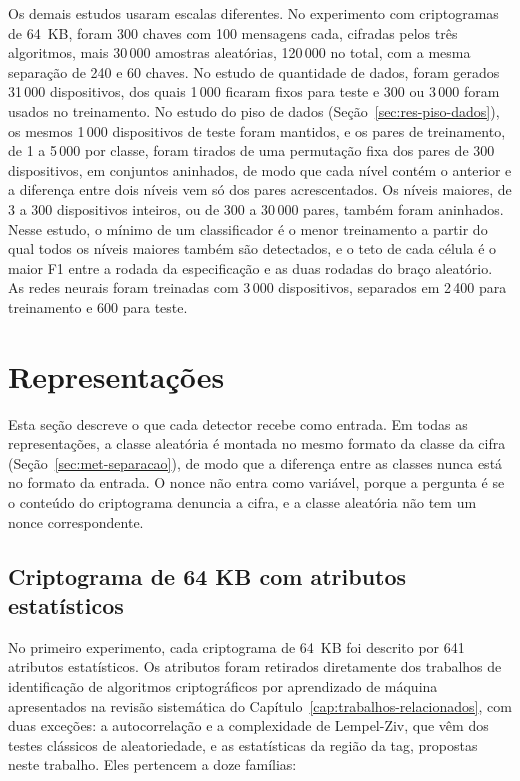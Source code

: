 Os demais estudos usaram escalas diferentes. No experimento com criptogramas de 64~KB, foram 300 chaves com 100 mensagens cada, cifradas pelos três algoritmos, mais 30\,000 amostras aleatórias, 120\,000 no total, com a mesma separação de 240 e 60 chaves. No estudo de quantidade de dados, foram gerados 31\,000 dispositivos, dos quais 1\,000 ficaram fixos para teste e 300 ou 3\,000 foram usados no treinamento. No estudo do piso de dados (Seção~\ref{sec:res-piso-dados}), os mesmos 1\,000 dispositivos de teste foram mantidos, e os pares de treinamento, de 1 a 5\,000 por classe, foram tirados de uma permutação fixa dos pares de 300 dispositivos, em conjuntos aninhados, de modo que cada nível contém o anterior e a diferença entre dois níveis vem só dos pares acrescentados. Os níveis maiores, de 3 a 300 dispositivos inteiros, ou de 300 a 30\,000 pares, também foram aninhados. Nesse estudo, o mínimo de um classificador é o menor treinamento a partir do qual todos os níveis maiores também são detectados, e o teto de cada célula é o maior F1 entre a rodada da especificação e as duas rodadas do braço aleatório. As redes neurais foram treinadas com 3\,000 dispositivos, separados em 2\,400 para treinamento e 600 para teste.

\section{Representações}
\label{sec:met-representacoes}

Esta seção descreve o que cada detector recebe como entrada. Em todas as representações, a classe aleatória é montada no mesmo formato da classe da cifra (Seção~\ref{sec:met-separacao}), de modo que a diferença entre as classes nunca está no formato da entrada. O nonce não entra como variável, porque a pergunta é se o conteúdo do criptograma denuncia a cifra, e a classe aleatória não tem um nonce correspondente.

\subsection{Criptograma de 64 KB com atributos estatísticos}
\label{sec:met-atributos}

No primeiro experimento, cada criptograma de 64~KB foi descrito por 641 atributos estatísticos. Os atributos foram retirados diretamente dos trabalhos de identificação de algoritmos criptográficos por aprendizado de máquina apresentados na revisão sistemática do Capítulo~\ref{cap:trabalhos-relacionados}, com duas exceções: a autocorrelação e a complexidade de Lempel-Ziv, que vêm dos testes clássicos de aleatoriedade, e as estatísticas da região da tag, propostas neste trabalho. Eles pertencem a doze famílias:

